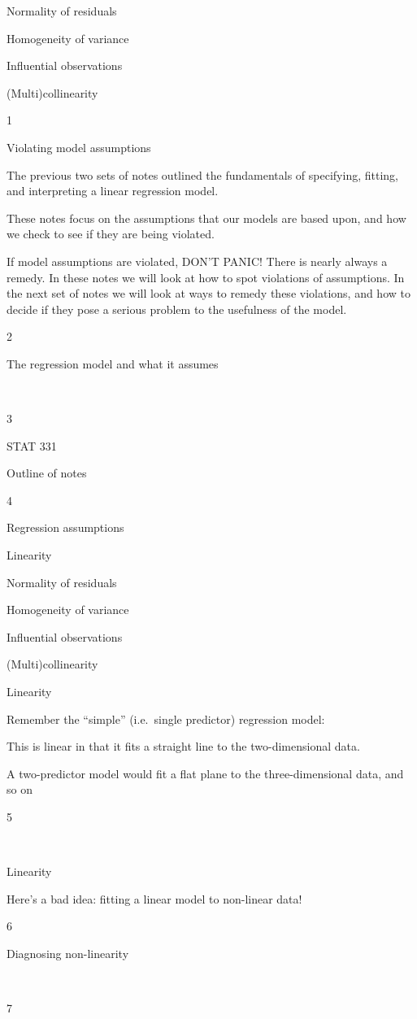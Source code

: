 \documentclass[
  letterpaper,
  DIV=11,
  numbers=noendperiod]{scrreprt}
\begin{document}
Normality of residuals

Homogeneity of variance

Influential observations

(Multi)collinearity

1

Violating model assumptions

The previous two sets of notes outlined the fundamentals of specifying,
fitting, and interpreting a linear regression model.

These notes focus on the assumptions that our models are based upon, and
how we check to see if they are being violated.

If model assumptions are violated, DON'T PANIC! There is nearly always a
remedy. In these notes we will look at how to spot violations of
assumptions. In the next set of notes we will look at ways to remedy
these violations, and how to decide if they pose a serious problem to
the usefulness of the model.

2

The regression model and what it assumes

~

3

STAT 331

Outline of notes

4

Regression assumptions

Linearity

Normality of residuals

Homogeneity of variance

Influential observations

(Multi)collinearity

Linearity

Remember the ``simple'' (i.e.~single predictor) regression model:

This is linear in that it fits a straight line to the two-dimensional
data.

A two-predictor model would fit a flat plane to the three-dimensional
data, and so on

5

~

Linearity

Here's a bad idea: fitting a linear model to non-linear data!

6

Diagnosing non-linearity

~

7
\end{document}
